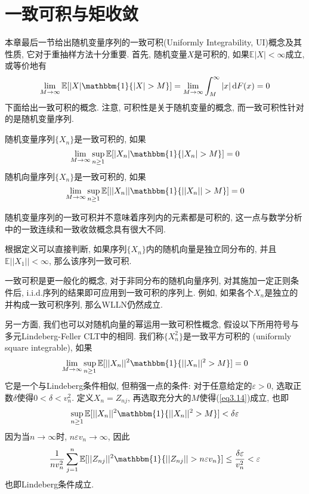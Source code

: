 \documentclass[cn, 12pt, math=mtpro2, bibstyle=apa, blue, twocol]{elegantbook}
\newcommand{\E}{\mathbb{E}}
\begin{document}
\section{一致可积与矩收敛}
本章最后一节给出随机变量序列的一致可积(Uniformly Integrability, UI)概念及其性质, 它对于重抽样方法十分重要. 首先, 随机变量$X$是可积的, 如果$\E|X|<\infty$成立, 或等价地有
$$\lim_{M\to\infty}\E[|X|\mathbbm{1}\{|X|>M\}]=\lim_{M\to\infty}\int_{M}^{\infty}|x|\,\text{d}F(x)=0$$
下面给出一致可积的概念. 注意, 可积性是关于随机变量的概念, 而一致可积性针对的是随机变量序列.
\begin{definition}
随机变量序列$\{X_n\}$是一致可积的, 如果
\begin{equation}\label{eq3.13}
  \lim_{M\to\infty}\sup_{n\ge1}\E[|X_n|\mathbbm{1}\{|X_n|>M\}]=0 \nonumber
\end{equation}
随机向量序列$\{X_n\}$是一致可积的, 如果
$$\lim_{M\to\infty}\sup_{n\ge1}\E[||X_n||\mathbbm{1}\{||X_n||>M\}]=0$$
\end{definition}
\begin{remark}
随机变量序列的一致可积并不意味着序列内的元素都是可积的, 这一点与数学分析中的一致连续和一致收敛概念具有很大不同.
\end{remark}
根据定义可以直接判断, 如果序列$\{X_n\}$内的随机向量是独立同分布的, 并且$\E||X_1||<\infty$, 那么该序列一致可积.

一致可积是更一般化的概念, 对于非同分布的随机向量序列, 对其施加一定正则条件后, i.i.d.序列的结果即可应用到一致可积的序列上. 例如, 如果各个$X_n$是独立的并构成一致可积序列, 那么WLLN仍然成立.

另一方面, 我们也可以对随机向量的幂运用一致可积性概念, 假设以下所用符号与多元Lindeberg-Feller CLT中的相同. 我们称$\{X_n^2\}$是一致平方可积的 (uniformly square integrable), 如果
\begin{equation}\label{eq3.14}
  \lim_{M\to\infty}\sup_{n\ge1}\E[||X_n||^2\mathbbm{1}\{||X_n||^2>M\}]=0
\end{equation}
它是一个与Lindeberg条件相似, 但稍强一点的条件: 对于任意给定的$\varepsilon>0$, 选取正数$\delta$使得$0<\delta<v_n^2$. 定义$X_n=Z_{nj}$, 再选取充分大的$M$使得(\ref{eq3.14})成立, 也即
$$\sup_{n\ge1}\E[||X_n||^2\mathbbm{1}\{||X_n||^2>M\}]<\delta\varepsilon$$
因为当$n\to\infty$时, $n\varepsilon v_n\to\infty$, 因此
$$\frac{1}{nv_n^2}\sum_{j=1}^n\E[||Z_{nj}||^2\mathbbm{1}\{||Z_{nj}||>n\varepsilon v_n\}]\leq\frac{\delta\varepsilon}{v_n^2}<\varepsilon$$
也即Lindeberg条件成立.
\end{document}

